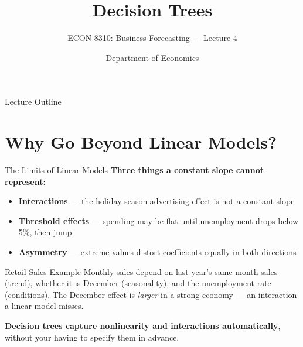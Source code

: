\documentclass[aspectratio=169, 11pt]{beamer}
\title[Decision Trees]{Decision Trees}
\subtitle{ECON 8310: Business Forecasting --- Lecture 4}
\author{Department of Economics}
\institute{University of Nebraska at Omaha}
\begin{document}

\begin{frame}
  \titlepage
\end{frame}

\begin{frame}{Lecture Outline}
  \tableofcontents
\end{frame}

\section{Why Go Beyond Linear Models?}


\begin{frame}{The Limits of Linear Models}
  \textbf{Three things a constant slope cannot represent:}
  \begin{itemize}
    \item \textbf{Interactions} --- the holiday-season advertising effect
          is not a constant slope
    \item \textbf{Threshold effects} --- spending may be flat until
          unemployment drops below 5\%, then jump
    \item \textbf{Asymmetry} --- extreme values distort coefficients
          equally in both directions
  \end{itemize}
  \begin{examplebox}{Retail Sales Example}
    Monthly sales depend on last year's same-month sales (trend),
    whether it is December (seasonality), and the unemployment rate
    (conditions). The December effect is \emph{larger} in a strong
    economy --- an interaction a linear model misses.
  \end{examplebox}
  \textbf{Decision trees capture nonlinearity and interactions automatically},
  without your having to specify them in advance.
\end{frame}
\end{document}
